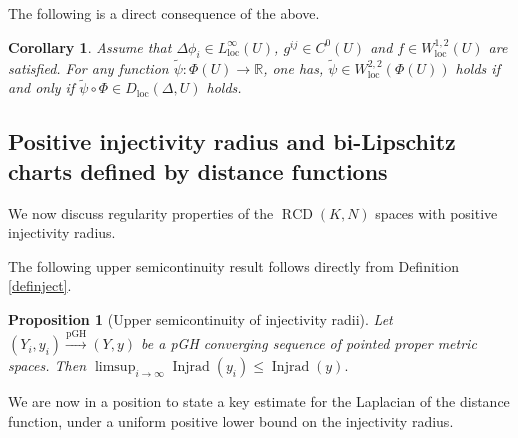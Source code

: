 \documentclass[11pt,reqno]{amsart}
\newtheorem{corollary}[theorem]{Corollary}
\newtheorem{proposition}[theorem]{Proposition}
\theoremstyle{definition}
\numberwithin{equation}{section}
\DeclareMathOperator{\Injrad}{Injrad}
\DeclareMathOperator{\loc}{loc}
\DeclareMathOperator{\RCD}{RCD}
\begin{document}
The following is a direct consequence of the above.
\begin{corollary}
    Assume that $\Delta \phi_i \in L^{\infty}_{\mathrm{loc}}(U)$, $g^{ij} \in C^0(U)$ and $f \in W^{1,2}_{\loc}(U)$ are satisfied. For any function $\tilde \psi: \Phi(U) \to \mathbb{R}$, one has, $\tilde \psi \in W^{2,2}_{\loc}(\Phi(U))$ holds if and only if $\tilde \psi \circ \Phi \in D_{\loc}(\Delta, U)$ holds.
\end{corollary}
\subsection{Positive injectivity radius and bi-Lipschitz charts defined by distance functions}\label{positivesub}

 We now discuss regularity properties of the $\RCD(K, N)$ spaces with positive injectivity radius.



The following upper semicontinuity result follows directly from Definition \ref{definject}.
\begin{proposition}[Upper semicontinuity of injectivity radii]\label{asasaso}
    Let 
$(Y_i, y_i) \xrightarrow{\mathrm{pGH}}  (Y, y)$
    be a pGH converging sequence of pointed proper metric spaces. Then
$
        \limsup_{i \to \infty} \Injrad (y_i) \le  \Injrad(y).
$
\end{proposition}


We are now in a position to state a key estimate for the Laplacian of the distance function, under  a uniform positive lower bound on the injectivity radius.
\end{document}
